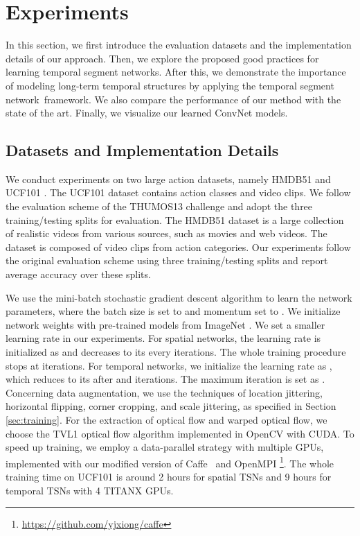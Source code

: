 \documentclass[runningheads]{llncs}
\newcommand{\SEGNET}{temporal segment network}
\begin{document}
\section{Experiments}
\label{sec:exp}

In this section, we first introduce the evaluation datasets and the implementation details of our approach. Then, we explore the proposed good practices for learning \SEGNET s. After this, we demonstrate the importance of modeling long-term temporal structures by applying the \SEGNET ~framework. We also compare the performance of our method with the state of the art. Finally, we visualize our learned ConvNet models.
\subsection{Datasets and Implementation Details}

We conduct experiments on two large action datasets, namely HMDB51 \cite{KuehneJGPS11} and UCF101 \cite{Soomro12}. The UCF101 dataset contains  action classes and  video clips. We follow the evaluation scheme of the THUMOS13 challenge \cite{THUMOS13} and adopt the three training/testing splits for evaluation.  The HMDB51 dataset is a large collection of realistic videos from various sources, such as movies and web videos. The dataset is composed of  video clips from  action categories. Our experiments follow the original evaluation scheme using three training/testing splits and report average accuracy over these splits.

We use the mini-batch stochastic gradient descent algorithm to learn the network parameters, where the batch size is set to  and momentum set to . We initialize network weights with pre-trained models from ImageNet \cite{DengDSLL009}. We set a smaller learning rate in our experiments. For spatial networks, the learning rate is initialized as  and decreases to its  every  iterations. The whole training procedure stops at  iterations. For temporal networks, we initialize the learning rate as , which reduces to its  after  and  iterations. The maximum iteration is set as . Concerning data augmentation, we use the techniques of location jittering, horizontal flipping, corner cropping, and scale jittering, as specified in Section \ref{sec:training}. For the extraction of optical flow and warped optical flow, we choose the TVL1 optical flow algorithm \cite{ZachPB07} implemented in OpenCV with CUDA.
To speed up training, we employ a data-parallel strategy with multiple GPUs, implemented with our modified version of Caffe~\cite{JiaSDKLGGD14} and OpenMPI \footnote{\url{https://github.com/yjxiong/caffe}}. The whole training time on UCF101 is around 2 hours for spatial TSNs and 9 hours for temporal TSNs with 4 TITANX GPUs.
\end{document}
